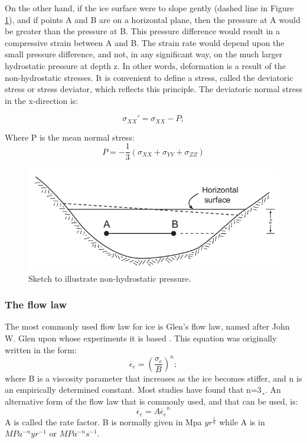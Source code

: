 \documentclass{article}
\begin{document}
On the other hand, if the ice surface were to slope gently (dashed line in
Figure \ref{Deviatoric_stress}), and if points A and B are on a horizontal plane, then the pressure at A would be greater than the pressure at B. This pressure difference would result in a compressive strain between A and B. The strain rate would depend upon the small pressure difference, and not, in any signiﬁcant way, on the much larger hydrostatic pressure at depth z. In other words, deformation is a result of the non-hydrostatic stresses. It is convenient to deﬁne a stress, called the deviatoric stress or stress deviator, which reﬂects this principle. The deviatoric normal stress in the x-direction is:

\begin{equation}
	\sigma_{XX}'= \sigma_{XX}-P;
\end{equation}

Where P is the mean normal stress:
\begin{equation}
	P=-\frac{1}{3}({\sigma_{XX}+\sigma_{YY}+\sigma_{ZZ}})
\end{equation}

\begin{figure}[!h]
	\centering
	\includegraphics[width=0.7\linewidth]{../fig/Non_hydrostatic_pressure.png}
	\caption{Sketch to illustrate non-hydrostatic pressure.}
	\label{Deviatoric_stress}
\end{figure}

\subsubsection{The flow law}

The most commonly used ﬂow law for ice is Glen’s ﬂow law, named after John
W. Glen upon whose experiments it is based \cite{glen1958flow}. This equation was originally written in the form:
\begin{equation}
	\dot{\epsilon_{e}}=({\frac{\sigma_{e}}{B}})^n;
\end{equation}
where B is a viscosity parameter that increases as the ice becomes stiffer, and n is an empirically determined constant. Most studies have found that n=3¸. An alternative form of the ﬂow law that is commonly used, and that can be used, is:
\begin{equation}
	\dot{\epsilon_{e}}=A\dot{\epsilon_{e}}^n
\end{equation}
A is called the rate factor. B is normally given in Mpa $yr^{\frac{1}{n}}$ while A is in $MPa^{-n} yr ^{-1}$ or $MPa^{-n} s ^{-1}$.
\end{document}
